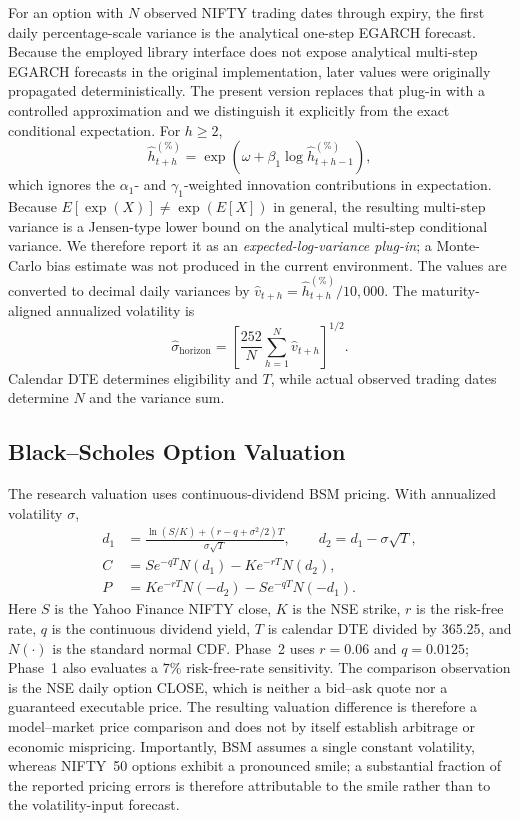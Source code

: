 \documentclass[journal]{IEEEtran}
\begin{document}
For an option with $N$ observed NIFTY trading dates through expiry, the first daily percentage-scale variance is the analytical one-step EGARCH forecast. Because the employed library interface does not expose analytical multi-step EGARCH forecasts in the original implementation, later values were originally propagated deterministically. The present version replaces that plug-in with a controlled approximation and we distinguish it explicitly from the exact conditional expectation. For $h\ge 2$,
\begin{equation}
\widehat h^{(\%)}_{t+h}=\exp\left(\omega+\beta_1\log\widehat h^{(\%)}_{t+h-1}\right),
\end{equation}
which ignores the $\alpha_1$- and $\gamma_1$-weighted innovation contributions in expectation. Because $E[\exp(X)]\neq\exp(E[X])$ in general, the resulting multi-step variance is a Jensen-type lower bound on the analytical multi-step conditional variance. We therefore report it as an \emph{expected-log-variance plug-in}; a Monte-Carlo bias estimate was not produced in the current environment. The values are converted to decimal daily variances by $\widehat v_{t+h}=\widehat h^{(\%)}_{t+h}/10{,}000$. The maturity-aligned annualized volatility is
\begin{equation}
\widehat\sigma_{\mathrm{horizon}}=\left[\frac{252}{N}\sum_{h=1}^{N}\widehat v_{t+h}\right]^{1/2}.
\end{equation}
Calendar DTE determines eligibility and $T$, while actual observed trading dates determine $N$ and the variance sum.

\subsection{Black--Scholes Option Valuation}

The research valuation uses continuous-dividend BSM pricing. With annualized volatility $\sigma$,
\begin{equation}
\begin{aligned}
d_1&=\frac{\ln(S/K)+(r-q+\sigma^2/2)T}{\sigma\sqrt T},\qquad d_2=d_1-\sigma\sqrt T,\\
C&=Se^{-qT}N(d_1)-Ke^{-rT}N(d_2),\\
P&=Ke^{-rT}N(-d_2)-Se^{-qT}N(-d_1).
\end{aligned}
\end{equation}
Here $S$ is the Yahoo Finance NIFTY close, $K$ is the NSE strike, $r$ is the risk-free rate, $q$ is the continuous dividend yield, $T$ is calendar DTE divided by 365.25, and $N(\cdot)$ is the standard normal CDF. Phase~2 uses $r=0.06$ and $q=0.0125$; Phase~1 also evaluates a $7\%$ risk-free-rate sensitivity. The comparison observation is the NSE daily option CLOSE, which is neither a bid--ask quote nor a guaranteed executable price. The resulting valuation difference is therefore a model--market price comparison and does not by itself establish arbitrage or economic mispricing. Importantly, BSM assumes a single constant volatility, whereas NIFTY~50 options exhibit a pronounced smile; a substantial fraction of the reported pricing errors is therefore attributable to the smile rather than to the volatility-input forecast.
\end{document}

